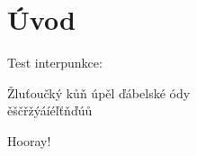 \chapter*{Úvod}

Test interpunkce:
\begin{center}
  Žluťoučký kůň úpěl ďábelské ódy\\
  ěščřžýáíéľťňďúů
\end{center}
Hooray!


